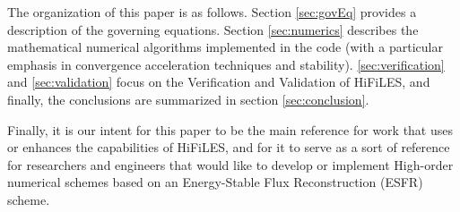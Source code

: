 The organization of this paper is as follows. Section \ref{sec:govEq} provides a description of the governing equations. Section \ref{sec:numerics} describes the mathematical numerical algorithms implemented in the code (with a particular emphasis in convergence acceleration techniques and stability). \ref{sec:verification} and \ref{sec:validation} focus on the Verification and Validation of HiFiLES, and finally, the conclusions are summarized in section \ref{sec:conclusion}.

Finally, it is our intent for this paper to be the main reference for work that uses or enhances the capabilities of HiFiLES, and for it to serve as a sort of reference for researchers and engineers that would like to develop or implement High-order numerical schemes based on an Energy-Stable Flux Reconstruction (ESFR) scheme.